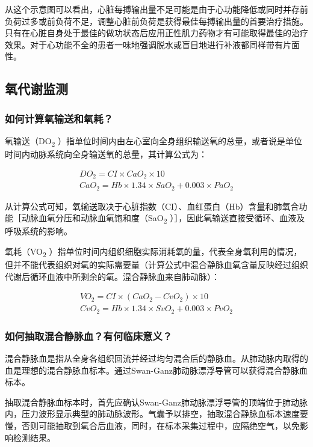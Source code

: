 从这个示意图可以看出，心脏每搏输出量不足可能是由于心功能降低或同时并存前负荷过多或前负荷不足，调整心脏前负荷是获得最佳每搏输出量的首要治疗措施。只有在心脏自身处于最佳的做功状态后应用正性肌力药物才有可能取得最佳的治疗效果。对于心功能不全的患者一味地强调脱水或盲目地进行补液都同样带有片面性。

\subsection{氧代谢监测}

\subsubsection{如何计算氧输送和氧耗？}

氧输送（DO\textsubscript{2}
）指单位时间内由左心室向全身组织输送氧的总量，或者说是单位时间内动脉系统向全身输送氧的总量，其计算公式为：

\[
  \begin{array}{l}
DO_2=CI\times CaO_2\times 10\\
CaO_2  =Hb\times 1.34\times SaO_2+0.003\times PaO_2
  \end{array}
\]

从计算公式可知，氧输送取决于心脏指数（CI）、血红蛋白（Hb）含量和肺氧合功能［动脉血氧分压和动脉血氧饱和度（SaO\textsubscript{2}
）］，因此氧输送直接受循环、血液及呼吸系统的影响。

氧耗（VO\textsubscript{2}
）指单位时间内组织细胞实际消耗氧的量，代表全身氧利用的情况，但并不能代表组织对氧的实际需要量（计算公式中混合静脉血氧含量反映经过组织代谢后循环血液中所剩余的氧。混合静脉血来自肺动脉）：

\[
  \begin{array}{l}
VO_2=CI\times (CaO_2-CvO_2)\times 10\\
CvO_2  =Hb\times 1.34\times SvO_2+0.003\times PvO_2
  \end{array}
\]

\subsubsection{如何抽取混合静脉血？有何临床意义？}

混合静脉血是指从全身各组织回流并经过均匀混合后的静脉血。从肺动脉内取得的血是理想的混合静脉血标本。通过Swan-Ganz肺动脉漂浮导管可以获得混合静脉血标本。

抽取混合静脉血标本时，首先应确认Swan-Ganz肺动脉漂浮导管的顶端位于肺动脉内，压力波形显示典型的肺动脉波形。气囊予以排空，抽取混合静脉血标本速度要慢，否则可能抽取到氧合后血液，同时，在标本采集过程中，应隔绝空气，以免影响检测结果。

